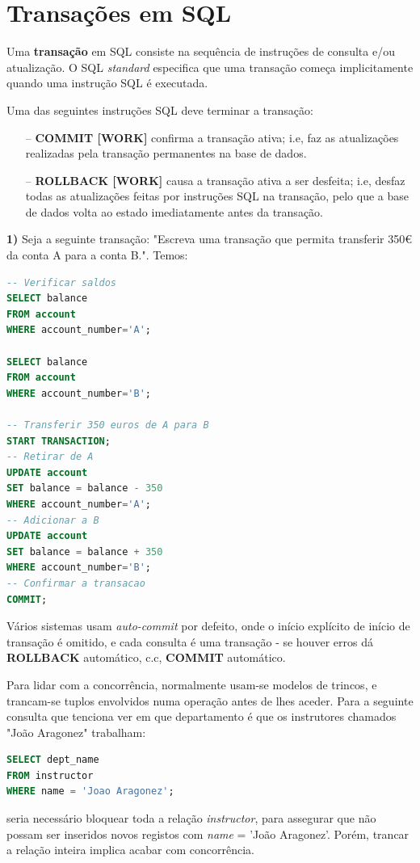\documentclass[oneside]{book}
\theoremstyle{definition}
\begin{document}
\section{Transações em SQL}
Uma \textbf{transação} em SQL consiste na sequência de instruções de consulta e/ou atualização. O SQL \textit{standard} especifica que uma transação começa implicitamente quando uma instrução SQL é executada.

Uma das seguintes instruções SQL deve terminar a transação:
\begin{itemize}
    \itemsep0cm
    \item[--] \textbf{COMMIT [WORK]} confirma a transação ativa; i.e, faz as atualizações realizadas pela transação permanentes na base de dados.
    \item[--] \textbf{ROLLBACK [WORK]} causa a transação ativa a ser desfeita; i.e, desfaz todas as atualizações feitas por instruções SQL na transação, pelo que a base de dados volta ao estado imediatamente antes da transação.
\end{itemize}

\textbf{1)} Seja a seguinte transação: "Escreva uma transação que permita transferir 350€ da conta A para a conta B.". Temos:
\begin{lstlisting}[language=SQL, morekeywords={REFERENCES, REFRESH, MATERIALIZED, CONCURRENTLY}, framesep=8pt, xleftmargin=40pt, framexleftmargin=40pt, frame=tb, framerule=0pt]
-- Verificar saldos
SELECT balance
FROM account
WHERE account_number='A';

SELECT balance
FROM account
WHERE account_number='B';

-- Transferir 350 euros de A para B
START TRANSACTION;
-- Retirar de A
UPDATE account
SET balance = balance - 350
WHERE account_number='A';
-- Adicionar a B
UPDATE account
SET balance = balance + 350
WHERE account_number='B';
-- Confirmar a transacao
COMMIT;
\end{lstlisting}

Vários sistemas usam \textit{auto-commit} por defeito, onde o início explícito de início de transação é omitido, e cada consulta é uma transação - se houver erros dá \textbf{ROLLBACK} automático, c.c, \textbf{COMMIT} automático.

Para lidar com a concorrência, normalmente usam-se modelos de trincos, e trancam-se tuplos envolvidos numa operação antes de lhes aceder.
Para a seguinte consulta que tenciona ver em que departamento é que os instrutores chamados "João Aragonez" trabalham:
\begin{lstlisting}[language=SQL, morekeywords={REFERENCES, REFRESH, MATERIALIZED, CONCURRENTLY}, framesep=8pt, xleftmargin=40pt, framexleftmargin=40pt, frame=tb, framerule=0pt]
SELECT dept_name
FROM instructor
WHERE name = 'Joao Aragonez';
\end{lstlisting}
seria necessário bloquear toda a relação \textit{instructor}, para assegurar que não possam ser inseridos novos registos com \textit{name} = 'João Aragonez'. Porém, trancar a relação inteira implica acabar com concorrência.
\end{document}
